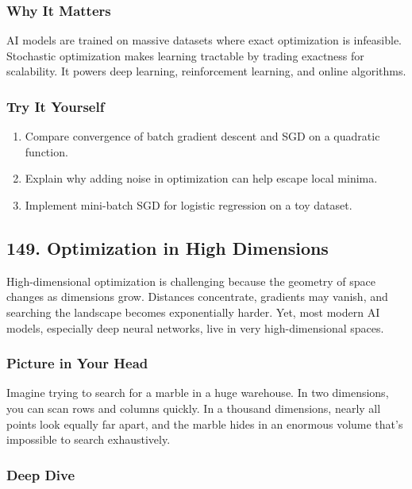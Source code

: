 \documentclass[
  letterpaper,
  DIV=11,
  numbers=noendperiod]{scrreprt}
\providecommand{\tightlist}{%
  \setlength{\itemsep}{0pt}\setlength{\parskip}{0pt}}
\begin{document}
\subsubsection{Why It Matters}\label{why-it-matters-45}

AI models are trained on massive datasets where exact optimization is
infeasible. Stochastic optimization makes learning tractable by trading
exactness for scalability. It powers deep learning, reinforcement
learning, and online algorithms.

\subsubsection{Try It Yourself}\label{try-it-yourself-147}

\begin{enumerate}
\def\labelenumi{\arabic{enumi}.}
\tightlist
\item
  Compare convergence of batch gradient descent and SGD on a quadratic
  function.
\item
  Explain why adding noise in optimization can help escape local minima.
\item
  Implement mini-batch SGD for logistic regression on a toy dataset.
\end{enumerate}

\subsection{149. Optimization in High
Dimensions}\label{optimization-in-high-dimensions}

High-dimensional optimization is challenging because the geometry of
space changes as dimensions grow. Distances concentrate, gradients may
vanish, and searching the landscape becomes exponentially harder. Yet,
most modern AI models, especially deep neural networks, live in very
high-dimensional spaces.

\subsubsection{Picture in Your Head}\label{picture-in-your-head-148}

Imagine trying to search for a marble in a huge warehouse. In two
dimensions, you can scan rows and columns quickly. In a thousand
dimensions, nearly all points look equally far apart, and the marble
hides in an enormous volume that's impossible to search exhaustively.

\subsubsection{Deep Dive}\label{deep-dive-148}
\end{document}
